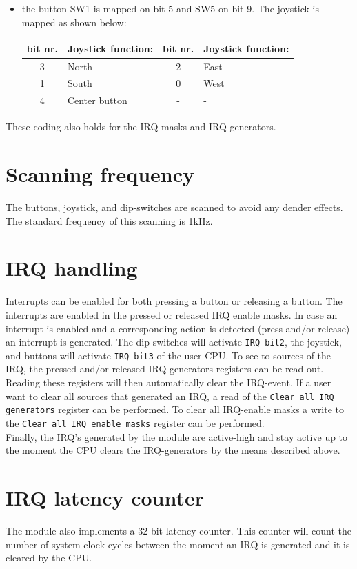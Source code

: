 \documentclass[a4paper,twoside,12pt]{article}
\begin{document}
\begin{itemize}
\item the button SW1 is mapped on bit 5 and SW5 on bit 9. The joystick is mapped as shown below:
\begin{center}
\begin{tabular}{|c|l|c|l|}
\hline
\textbf{bit nr.}&\textbf{Joystick function:}&\textbf{bit nr.}&\textbf{Joystick function:}\\
\hline
\hline
3&North&2&East\\
\hline
1&South&0&West\\
\hline
4&Center button&-&-\\
\hline
\end{tabular}
\end{center}
\end{itemize}
These coding also holds for the IRQ-masks and IRQ-generators.
\section{Scanning frequency}
The buttons, joystick, and dip-switches are scanned to avoid any dender effects. The standard frequency of this scanning is 1kHz.
\section{IRQ handling}
Interrupts can be enabled for both pressing a button or releasing a button. The interrupts are enabled in the pressed or released IRQ enable masks. In case an interrupt is enabled and a corresponding action is detected (press and/or release) an interrupt is generated. The dip-switches will activate \texttt{IRQ bit2}, the joystick, and buttons will activate \texttt{IRQ bit3} of the user-CPU. To see to sources of the IRQ, the pressed and/or released IRQ generators registers can be read out. Reading these registers will then automatically clear the IRQ-event. If a user want to clear all sources that generated an IRQ, a read of the \texttt{Clear all IRQ generators} register can be performed. To clear all IRQ-enable masks a write to the \texttt{Clear all IRQ enable masks} register can be performed.\\
Finally, the IRQ's generated by the module are active-high and stay active up to the moment the CPU clears the IRQ-generators by the means described above.
\section{IRQ latency counter}
The module also implements a 32-bit latency counter. This counter will count the number of system clock cycles between the moment an IRQ is generated and it is cleared by the CPU.
\end{document}
